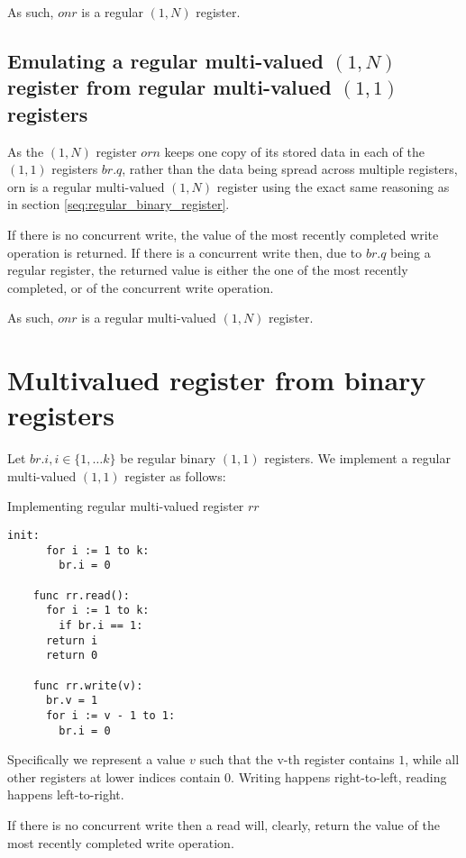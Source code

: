 \documentclass[a4paper]{scrreprt}
\begin{document}
As such, $onr$ is a regular $(1, N)$ register.

\subsection{Emulating a regular multi-valued $(1, N)$ register from regular multi-valued $(1, 1)$ registers}

As the $(1, N)$ register $orn$ keeps one copy of its stored data in each of the
$(1, 1)$ registers $br.q$, rather than the data being spread across multiple
registers, orn is a regular multi-valued $(1, N)$ register using the exact same
reasoning as in section \ref{seq:regular_binary_register}.

If there is no concurrent write, the value of the most recently completed write
operation is returned. If there is a concurrent write then, due to $br.q$ being
a regular register, the returned value is either the one of the most recently
completed, or of the concurrent write operation.

As such, $onr$ is a regular multi-valued $(1, N)$ register.


\section{Multivalued register from binary registers}

Let $br.i, i \in \{1, \ldots k\}$ be regular binary $(1, 1)$ registers. We
implement a regular multi-valued $(1, 1)$ register as follows:

\begin{library}{Implementing regular multi-valued register $rr$}
  \begin{lstlisting}[mathescape=true,autogobble=true,breaklines=true]
    init:
      for i := 1 to k:
        br.i = 0

    func rr.read():
      for i := 1 to k:
        if br.i == 1:
	  return i
      return 0

    func rr.write(v):
      br.v = 1
      for i := v - 1 to 1:
        br.i = 0
  \end{lstlisting}
\end{library}

Specifically we represent a value $v$ such that the v-th register contains $1$,
while all other registers at lower indices contain $0$. Writing happens
right-to-left, reading happens left-to-right.

If there is no concurrent write then a read will, clearly, return the value of
the most recently completed write operation.
\end{document}
